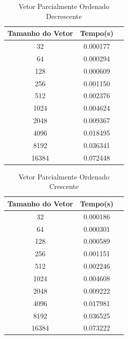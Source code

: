 \documentclass[12pt,a4paper,twoside]{report}
\begin{document}
\begin{table}[h]
  \centering
  \caption{Vetor Parcialmente Ordenado Decrescente \label{tab:pod}}
  \begin{tabular}{ccc} \\\hline
  \textbf{Tamanho do Vetor}  & \textbf{Tempo(s)} \\\hline
  32                              & 0.000177          \\\hline
  64                              & 0.000294          \\\hline
  128                             & 0.000609          \\\hline
  256                             & 0.001150          \\\hline
  512                             & 0.002376         \\\hline
  1024                            & 0.004624          \\\hline
  2048                            & 0.009367          \\\hline
  4096                            & 0.018495         \\\hline
  8192                            & 0.036341        \\\hline
  16384                           & 0.072448
  \\\hline
  \end{tabular}
\end{table}



\begin{table}[h]
  \centering
  \caption{Vetor Parcialmente Ordenado Crescente \label{tab:poc}}
  \begin{tabular}{ccc} \\\hline
  \textbf{Tamanho do Vetor}  & \textbf{Tempo(s)} \\\hline
  32                              & 0.000186          \\\hline
  64                              & 0.000301          \\\hline
  128                             & 0.000589          \\\hline
  256                             & 0.001151          \\\hline
  512                             & 0.002246          \\\hline
  1024                            & 0.004608          \\\hline
  2048                            & 0.009222          \\\hline
  4096                            & 0.017981
  \\\hline
  8192                            & 0.036525
  \\\hline
  16384                           & 0.073222

  \\\hline
  \end{tabular}
\end{table}
\end{document}
